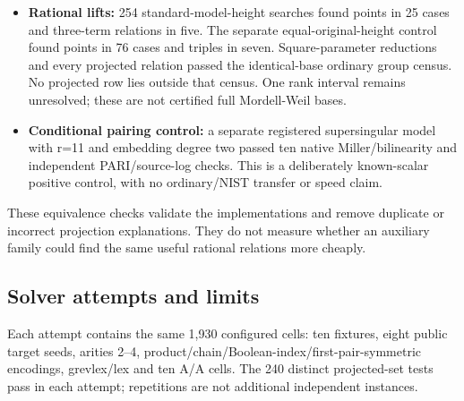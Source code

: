\documentclass[
  10pt,
]{article}
\begin{document}
\begin{itemize}
  finite lookup inverses remain separate toy controls.
\item
  \textbf{Rational lifts:} 254 standard-model-height searches found
  points in 25 cases and three-term relations in five. The separate
  equal-original-height control found points in 76 cases and triples in
  seven. Square-parameter reductions and every projected relation passed
  the identical-base ordinary group census. No projected row lies
  outside that census. One rank interval remains unresolved; these are
  not certified full Mordell-Weil bases.
\item
  \textbf{Conditional pairing control:} a separate registered
  supersingular model with r=11 and embedding degree two passed ten
  native Miller/bilinearity and independent PARI/source-log checks. This
  is a deliberately known-scalar positive control, with no ordinary/NIST
  transfer or speed claim.
\end{itemize}

These equivalence checks validate the implementations and remove
duplicate or incorrect projection explanations. They do not measure
whether an auxiliary family could find the same useful rational
relations more cheaply.

\subsection{Solver attempts and
limits}\label{solver-attempts-and-limits}

Each attempt contains the same 1,930 configured cells: ten fixtures,
eight public target seeds, arities 2--4,
product/chain/Boolean-index/first-pair-symmetric encodings, grevlex/lex
and ten A/A cells. The 240 distinct projected-set tests pass in each
attempt; repetitions are not additional independent instances.
\end{document}
